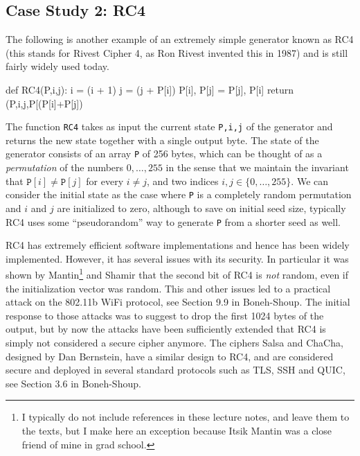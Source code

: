 \subsection{Case Study 2: RC4}\label{Case-Study--RC}

The following is another example of an extremely simple generator known
as RC4 (this stands for Rivest Cipher 4, as Ron Rivest invented this in
1987) and is still fairly widely used today.

\begin{code}
def RC4(P,i,j):
    i = (i + 1) %
    j = (j + P[i]) %
    P[i], P[j] = P[j], P[i]
    return (P,i,j,P[(P[i]+P[j]) %
\end{code}

The function \texttt{RC4} takes as input the current state
\texttt{P,i,j} of the generator and returns the new state together with
a single output byte. The state of the generator consists of an array
\texttt{P} of 256 bytes, which can be thought of as a \emph{permutation}
of the numbers \(0,\ldots,255\) in the sense that we maintain the
invariant that \(\texttt{P}[i]\neq\texttt{P}[j]\) for every \(i\neq j\),
and two indices \(i,j \in \{0,\ldots,255\}\). We can consider the
initial state as the case where \texttt{P} is a completely random
permutation and \(i\) and \(j\) are initialized to zero, although to
save on initial seed size, typically RC4 uses some ``pseudorandom'' way
to generate \texttt{P} from a shorter seed as well.

RC4 has extremely efficient software implementations and hence has been
widely implemented. However, it has several issues with its security. In
particular it was shown by Mantin\footnote{I typically do not include
  references in these lecture notes, and leave them to the texts, but I
  make here an exception because Itsik Mantin was a close friend of mine
  in grad school.} and Shamir that the second bit of RC4 is \emph{not}
random, even if the initialization vector was random. This and other
issues led to a practical attack on the 802.11b WiFi protocol, see
Section 9.9 in Boneh-Shoup. The initial response to those attacks was to
suggest to drop the first 1024 bytes of the output, but by now the
attacks have been sufficiently extended that RC4 is simply not
considered a secure cipher anymore. The ciphers Salsa and ChaCha,
designed by Dan Bernstein, have a similar design to RC4, and are
considered secure and deployed in several standard protocols such as
TLS, SSH and QUIC, see Section 3.6 in Boneh-Shoup.

